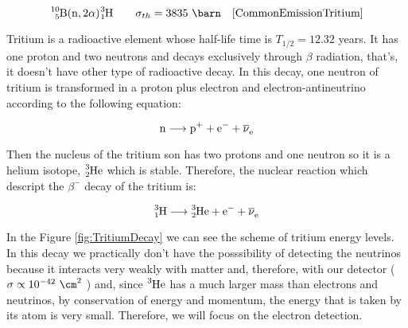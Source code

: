 
\begin{equation}
\ce{^{10}_{5}B}(\ce{n},2\alpha)\ce{^{3}_{1}H} \qquad \sigma_{th}= 3835~\barn ~~~\cite{CommonEmissionTritium}
\label{capneuB10}
\end{equation}





Tritium is a radioactive element whose half-life time is $T_{1/2}= 12.32$ years. It has one proton and two neutrons and decays exclusively through $\beta$ radiation, that's, it doesn't have other type of radioactive decay. In this decay, one neutron of tritium is transformed in a proton plus electron and electron-antineutrino according to the following equation:

\begin{equation}
\ce{n} \longrightarrow \ce{p^+}  + \ce{e^-}  + \ce{\overline{\nu}_e}
\label{BetaDecay}
\end{equation}

Then the nucleus of the tritium son has two protons and one neutron so it is a helium isotope, $\ce{^{3}_{2}He}$ which is stable. Therefore, the nuclear reaction which descript the $\beta^-$ decay of the tritium is:

\begin{equation}
\ce{^{3}_{1}H} \longrightarrow \ce{^{3}_{2}He}  + \ce{e^-}  + \ce{\overline{\nu}_e}
\label{TritiumDecay}
\end{equation}

In the Figure \ref{fig:TritiumDecay} we can see the scheme of tritium energy levels. In this decay we practically don't have the posssibility of detecting the neutrinos because it interacts very weakly with matter and, therefore, with our detector ($\sigma \propto 10^{-42} ~ \cm^2$ \cite{CrossSeccionNeutrino}) and, since $\ce{^{3}He}$ has a much larger mass than electrons and neutrinos, by conservation of energy and momentum, the energy that is taken by its atom is very small. Therefore, we will focus on the electron detection. 


